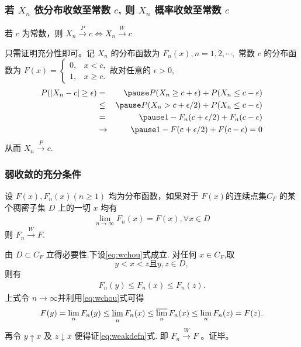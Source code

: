 \begin{frame}
	\frametitle{若 $X_n$ 依分布收敛至常数 $c$, 则 $X_n$ 概率收敛至常数 $c$}
	\begin{thm}
		若 $c$ 为常数，则 $X_n\stackrel{P}{\rightarrow} c\Leftrightarrow X_n\stackrel{W}{\rightarrow} c$
	\end{thm}

	\pause 只需证明充分性即可。记 $X_n$ 的分布函数为 $F_n (x), n=1,2,\cdots, $ 常数 $c$ 的分布函数为 $F (x)=\left\{
	\begin{array}{ll}
		0, &x<c,\\
		1, &x\ge c.
	\end{array}\right.
	$\pause 故对任意的 $\epsilon>0$,
	\begin{eqnarray*}
		P(|X_n-c|\ge \epsilon)&=&\pause P(X_n\ge c+\epsilon)+P(X_n\le c-\epsilon)\\
		&\le&\pause  P(X_n> c+\epsilon/2)+P(X_n\le c-\epsilon)\\
		&=&\pause 1-F_n(c+\epsilon/2)+F_n(c-\epsilon)\\
		&\rightarrow& \pause 1-F(c+\epsilon/2)+F(c-\epsilon)=0
	\end{eqnarray*}
	\pause 从而 $X_n\stackrel{P}{\rightarrow} c$.
\end{frame}


\begin{frame}
	\frametitle{弱收敛的充分条件}
	\begin{thm}
		设 $F (x), F_n (x)(n\geq 1)$ 均为分布函数，如果对于 $F(x)$的连续点集$C_F$ 的某个稠密子集 $D$ 上的一切 $x$ 均有
		\begin{eqnarray}\label{eq:wchou}
			\lim_{n\rightarrow\infty}F_n(x)=F(x), \forall x\in D
		\end{eqnarray}
		则 $F_n\stackrel{W}\rightarrow F$.
	\end{thm}
\pause

\zheng 由 $D \subset C_{F}$ 立得必要性.下设\eqref{eq:wchou}式成立. 对任何 $x \in C_{F}$,取
$$y<x<z \text{且} y, z \in D,$$ 则有\pause
\begin{align}
	F_{n}(y) \leq F_{n}(x) \leq F_{n}(z).
\end{align}\pause
上式令 $n \rightarrow \infty$并利用\eqref{eq:wchou}式可得
\[
F(y)=\lim _{n} F_{n}(y) \leq \varliminf_{n} F_{n}(x) \leq \varlimsup_{n} F_{n}(x) \leq \lim _{n} F_{n}(z)=F(z) .
\]
\pause
再令 $y \uparrow x$ 及 $z \downarrow x$ 便得证\eqref{eq:weakdefn}式. 即 $F_{n} \xrightarrow{W} F$ 。证毕。


\end{frame}


